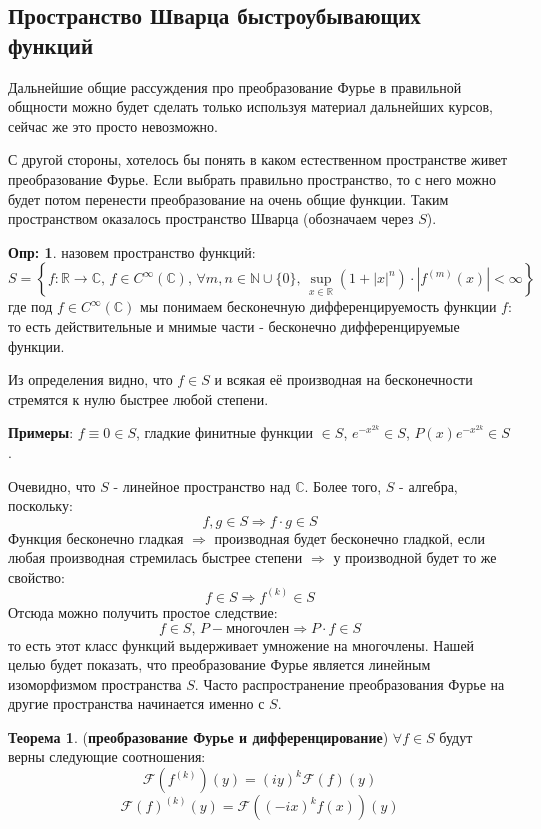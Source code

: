 \documentclass[12pt]{article}
\newcommand{\MR}{\mathbb{R}}
\newcommand{\MC}{\mathbb{C}}
\newcommand{\MN}{\mathbb{N}}
\theoremstyle{definition}
\newtheorem{defn}{Опр:}
\newtheorem{theorem}{Теорема}
\newcommand{\fourt}[1]{\mathcal{F}\left(#1\right)}
\begin{document}
\subsection*{Пространство Шварца быстроубывающих функций}
Дальнейшие общие рассуждения про преобразование Фурье в правильной общности можно будет сделать только используя материал дальнейших курсов, сейчас же это просто невозможно. 

С другой стороны, хотелось бы понять в каком естественном пространстве живет преобразование Фурье. Если выбрать правильно пространство, то с него можно будет потом перенести преобразование на очень общие функции. Таким пространством оказалось пространство Шварца (обозначаем через $S$).

\begin{defn}
	 назовем пространство функций:
	$$
		S = \left\{f \colon \MR \to \MC, \, f \in C^{\infty}(\MC), \, \forall m, n \in \MN \cup\{0\}, \, \sup\limits_{x 
		\in \MR}\left(1 + |x|^n\right){\cdot}|f^{(m)}(x)| < \infty\right\}
	$$
	где под $f \in C^{\infty}(\MC)$ мы понимаем бесконечную дифференцируемость функции $f$: то есть действительные и мнимые части - бесконечно дифференцируемые функции. 
\end{defn}
Из определения видно, что $f \in S$ и всякая её производная на бесконечности стремятся к нулю быстрее любой степени.

\newpage
\textbf{Примеры}: $f \equiv 0 \in S$, гладкие финитные функции $\in S$, $e^{-x^{2k}} \in S$, $P(x)e^{-x^{2k}} \in S$. 

Очевидно, что $S$ - линейное пространство над $\MC$. Более того, $S$ - алгебра, поскольку: 
$$
	f,g \in S \Rightarrow f{\cdot}g \in S
$$
Функция бесконечно гладкая $\Rightarrow$ производная будет бесконечно гладкой, если любая производная стремилась быстрее степени $\Rightarrow$ у производной будет то же свойство:
$$
	f \in S \Rightarrow f^{(k)} \in S
$$ 
Отсюда можно получить простое следствие:
$$
	f \in S, \, P - \text{многочлен} \Rightarrow P{\cdot}f \in S
$$
то есть этот класс функций выдерживает умножение на многочлены. Нашей целью будет показать, что преобразование Фурье является линейным изоморфизмом пространства $S$. Часто распространение преобразования Фурье на другие пространства начинается именно с $S$.
\begin{theorem}(\textbf{преобразование Фурье и дифференцирование}) $\forall f \in S$ будут верны следующие соотношения:
	$$
		\fourt{f^{(k)}}(y) = (iy)^k\fourt{f}(y)
	$$
	$$	
		\fourt{f}^{(k)}(y) = \fourt{(-ix)^kf(x)}(y)
	$$
\end{theorem}
\end{document}
